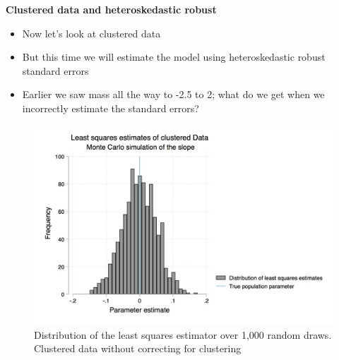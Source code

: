 \documentclass[notes=show]{beamer}
\begin{document}
\begin{frame}[plain]
\begin{center}
\textbf{Clustered data and heteroskedastic robust}
\end{center}

\begin{itemize}
\item Now let's look at clustered data
\item But this time we will estimate the model using heteroskedastic robust standard errors
\item Earlier we saw mass all the way to -2.5 to 2; what do we get when we incorrectly estimate the standard errors?
\end{itemize}

\end{frame}

\begin{frame}[plain]

\begin{figure}[htb]\centering \includegraphics[scale=0.25]{./lecture_includes/ls_dist_clust.jpg}
\caption{Distribution of the least squares estimator over 1,000 random draws. Clustered data without correcting for clustering}
\end{figure}

\end{frame}
\end{document}
